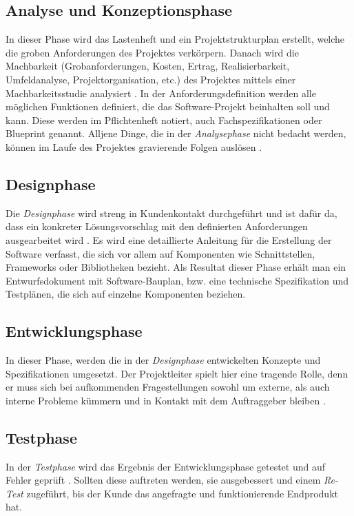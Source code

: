 \subsection{Analyse und Konzeptionsphase}
In dieser Phase wird das Lastenheft und ein Projektstrukturplan erstellt, welche die groben Anforderungen des Projektes verkörpern. Danach wird die Machbarkeit (Grobanforderungen, Kosten, Ertrag, Realisierbarkeit, Umfeldanalyse, Projektorganisation, etc.) des Projektes mittels einer Machbarkeitsstudie analysiert \cite{pm-wasserfall-ionos}. In der Anforderungsdefinition werden alle möglichen Funktionen definiert, die das Software-Projekt beinhalten soll und kann. Diese werden im Pflichtenheft notiert, auch Fachspezifikationen oder Blueprint genannt. Alljene Dinge, die in der \textit{Analysephase} nicht bedacht werden, können im Laufe des Projektes gravierende Folgen auslösen \cite{pm-wasserfall-online}.
\subsection{Designphase}
Die \textit{Designphase} wird streng in Kundenkontakt durchgeführt \cite{pm-wasserfall-online} und ist dafür da, dass ein konkreter Lösungsvorschlag mit den definierten Anforderungen ausgearbeitet wird \cite{pm-wasserfall-ionos}. Es wird eine detaillierte Anleitung für die Erstellung der Software verfasst, die sich vor allem auf Komponenten wie Schnittstellen, Frameworks oder Bibliotheken bezieht. Als Resultat dieser Phase erhält man ein Entwurfsdokument mit Software-Bauplan, bzw. eine technische Spezifikation und Testplänen, die sich auf einzelne Komponenten beziehen.
\subsection{Entwicklungsphase}
In dieser Phase, werden die in der \textit{Designphase} entwickelten Konzepte und Spezifikationen umgesetzt. Der Projektleiter spielt hier eine tragende Rolle, denn er muss sich bei aufkommenden Fragestellungen sowohl um externe, als auch interne Probleme kümmern und in Kontakt mit dem Auftraggeber bleiben \cite{pm-wasserfall-online}. 
\subsection{Testphase}
In der \textit{Testphase} wird das Ergebnis der Entwicklungsphase getestet und auf Fehler geprüft \cite{pm-wasserfall-online}. Sollten diese auftreten werden, sie ausgebessert und einem \textit{Re-Test} zugeführt, bis der Kunde das angefragte und funktionierende Endprodukt hat.
